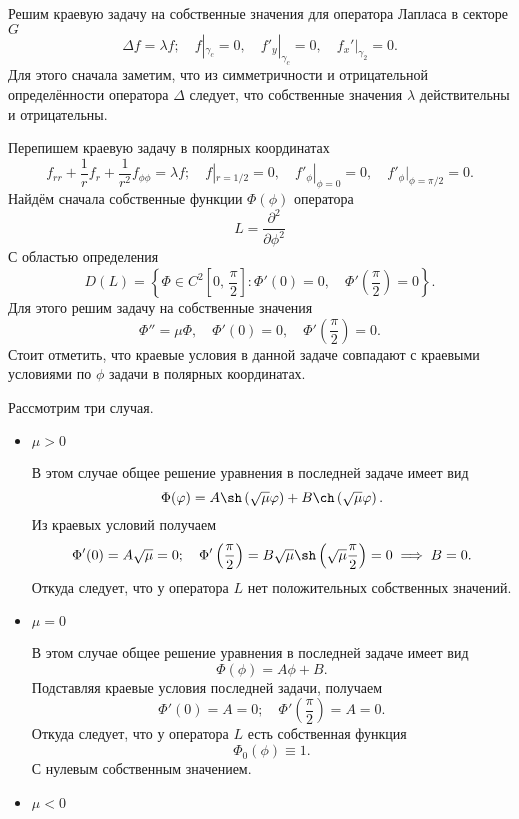 \documentclass[a4paper]{article}
\begin{document}
\begin{sol}
\begin{enumerate}
Решим краевую задачу на собственные значения для оператора 
Лапласа в секторе $G$ 
\[
\Delta f =\lambda f;\quad f|_{\gamma_c}=0,\quad
f'_y|_{\gamma_c}=0,\quad f_x'|_{\gamma_2}=0
.\] 
Для этого сначала заметим, что из симметричности и отрицательной
определённости оператора $\Delta$ следует, что собственные
значения $\lambda$ действительны и отрицательны.

Перепишем краевую задачу в полярных координатах
\[
f_{rr}+\frac{1}{r}f_r+\frac{1}{r^2}f_{\phi\phi}=\lambda f;
\quad f|_{r= 1 /2}=0,\quad
f'_\phi|_{\phi=0}=0,\quad
f'_\phi|_{\phi= \pi /2}=0
.\] 
Найдём сначала собственные функции $\Phi(\phi)$ оператора
\[
L=\frac{\partial^2}{\partial \phi^2}
\]
С областью определения
\[
	D(L)= \left\{ \Phi \in C^2 \left[ 0,\,\frac{\pi}{2} \right] \colon \Phi'(0)=0,\quad \Phi'\left( \frac{\pi}{2} \right) =0 \right\} 
.\] 
Для этого решим задачу на собственные значения
\[
	\Phi''=\mu \Phi,\quad \Phi'(0)=0,\quad \Phi'\left( 
	\frac{\pi}{2}\right) =0
.\] 
Стоит отметить, что краевые условия в данной задаче совпадают с краевыми
условиями по $\phi$ задачи в полярных координатах.

Рассмотрим три случая.
\begin{itemize}
\item $\mu>0$ 

	В этом случае общее решение уравнения в последней задаче
	имеет вид
	\[
		\Phi(\phi)= A \sh\left( \sqrt{\mu} \phi \right) +
		B \ch \left( \sqrt{\mu} \phi \right) 
	.\]
	Из краевых условий получаем
	\[
		\Phi'(0)= A\sqrt{\mu} =0;\quad
		\Phi'\left( \frac{\pi}{2} \right) =
		B \sqrt{\mu}  \sh \left( \sqrt{\mu} \frac{\pi}{2} \right) =0\implies B=0
	.\] 
Откуда следует, что у оператора $L$ нет положительных собственных
значений.
\item $\mu=0$ 

	В этом случае общее решение уравнения в последней
	задаче имеет вид
	\[
		\Phi(\phi)=A \phi+B
	.\] 
	Подставляя краевые условия последней задачи, получаем
	\[
		\Phi'(0)=A=0;\quad \Phi'\left( \frac{\pi}{2} \right) =A=0
	.\] 
	Откуда следует, что у оператора $L$ есть собственная
	функция
	\[
		\Phi_0(\phi)\equiv 1
	.\] 
	С нулевым собственным значением.
\item $\mu<0$ 


\end{itemize}
\end{enumerate}
\end{sol}
\end{document}
